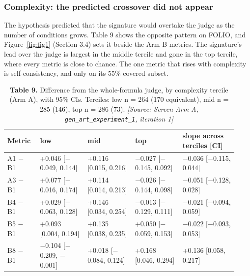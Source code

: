\documentclass[11pt,letterpaper]{article}
\begin{document}
\subsubsection{Complexity: the predicted crossover did not appear}

The hypothesis predicted that the signature would overtake the judge as the number of conditions grows. Table 9 shows the opposite pattern on FOLIO, and Figure~\ref{fig:fig1} (Section 3.4) sets it beside the Arm B metrics. The signature's lead over the judge is largest in the middle tercile and gone in the top tercile, where every metric is close to chance. The one metric that rises with complexity is self-consistency, and only on its 55\% covered subset.

\begin{table}[H]
\centering
\small
\setlength{\tabcolsep}{3pt}
\caption*{\textbf{Table 9.} Difference from the whole-formula judge, by complexity tercile (Arm A), with 95\% CIs. Terciles: low n = 264 (170 equivalent), mid n = 285 (146), top n = 286 (73). \textit{[Source: Screen Arm A, \texorpdfstring{\textup{\nolinkurl{gen_art_experiment_1}}}{gen art experiment 1}, iteration 1]}}
\begin{tabular}{>{\raggedright\arraybackslash}p{0.131\linewidth}>{\raggedright\arraybackslash}p{0.194\linewidth}>{\raggedright\arraybackslash}p{0.190\linewidth}>{\raggedright\arraybackslash}p{0.190\linewidth}>{\raggedright\arraybackslash}p{0.221\linewidth}}
\toprule
\textbf{Metric} & \textbf{low} & \textbf{mid} & \textbf{top} & \textbf{slope across terciles [CI]} \\
\midrule
{}A1 $-$ B1 & +0.046 [$-$0.049, 0.144] & +0.116 [0.015, 0.216] & $-$0.027 [$-$0.145, 0.092] & $-$0.036 [$-$0.115, 0.044] \\
{}A3 $-$ B1 & +0.077 [$-$0.016, 0.174] & +0.114 [0.014, 0.213] & $-$0.026 [$-$0.144, 0.098] & $-$0.051 [$-$0.128, 0.028] \\
{}B4 $-$ B1 & +0.029 [$-$0.063, 0.128] & +0.146 [0.034, 0.254] & $-$0.013 [$-$0.129, 0.111] & $-$0.021 [$-$0.094, 0.059] \\
{}B5 $-$ B1 & +0.093 [0.004, 0.194] & +0.135 [0.038, 0.235] & +0.050 [$-$0.059, 0.153] & $-$0.022 [$-$0.093, 0.053] \\
{}B8 $-$ B1 & $-$0.104 [$-$0.209, $-$0.001] & +0.018 [$-$0.084, 0.124] & +0.168 [0.046, 0.294] & +0.136 [0.058, 0.217] \\
\bottomrule
\end{tabular}
\end{table}
\end{document}
